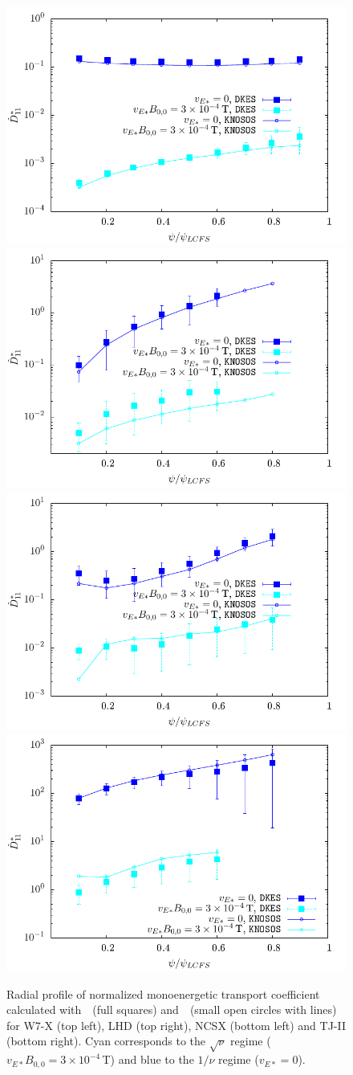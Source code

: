 \begin{figure}
\centering
\includegraphics[angle=0,width=0.45\columnwidth]{figures/d11w7x_prof.pdf}
\includegraphics[angle=0,width=0.45\columnwidth]{figures/d11lhd_prof.pdf}
\includegraphics[angle=0,width=0.45\columnwidth]{figures/d11ncsx_prof.pdf}
\includegraphics[angle=0,width=0.45\columnwidth]{figures/d11tj2_prof.pdf}
\caption{Radial profile of normalized monoenergetic transport coefficient calculated with~\DKES~(full squares) and~\KNOSOS~(small open circles with lines) for W7-X (top left), LHD (top right), NCSX (bottom left) and TJ-II (bottom right). Cyan corresponds to the $\sqrt{\nu}$ regime ($v_{E*}B_{0,0}=3\times 10^{-4}\,$T) and blue to the $1/\nu$ regime ($v_{E*}=0$).}
\label{FIG_D11PROF}
\end{figure}

